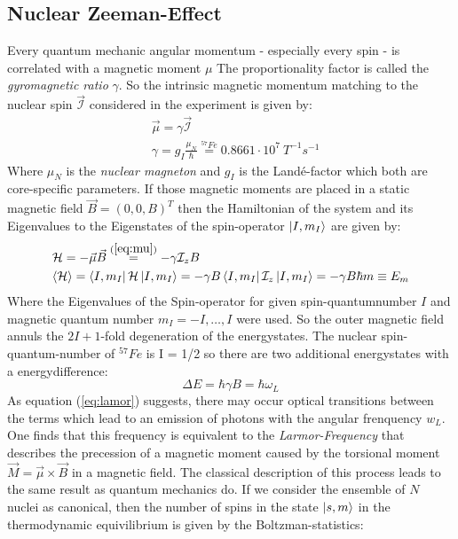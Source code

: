 	\subsection{Nuclear Zeeman-Effect}
		Every quantum mechanic angular momentum - especially every spin - is correlated with a magnetic moment $\mu$ The proportionality factor is called the \textit{gyromagnetic ratio} $\gamma$. So the intrinsic magnetic momentum matching to the nuclear spin $\vec{\mathcal{I}}$ considered in the experiment is given by:
			\begin{align}
				&\vec{\mu} = \gamma \vec{\mathcal{I}} \label{eq:mu}\\
				&\gamma  = g_I \frac{\mu_N}{\hbar} \overset{^{57}Fe}{=} 0.8661\cdot 10^{7}\ \unit{T^{-1}s^{-1}} \label{eq:gamma}
			\end{align}
		Where $\mu_N$ is the \textit{nuclear magneton} and $g_I$ is the Land\'{e}-factor which both are core-specific pa\-ra\-me\-ters. If those magnetic moments are placed in a static magnetic field $\vec{B} = (0,0,B)^T$ then the Hamiltonian of the system and its Eigenvalues to the Eigenstates of the spin-operator $\ket{I,m_I}$ are given by:
			\begin{align}
				&\mathcal{H} = - \vec{\mu} \vec{B} \overset{(\ref{eq:mu})}{=} - \gamma \mathcal{I}_zB \\
				&\langle\mathcal{H}\rangle = \bra{I,m_I}\mathcal{H}\ket{I,m_I} = -\gamma B \bra{I,m_I}\mathcal{I}_z\ket{I,m_I} = -\gamma B \hbar m \equiv E_m
			\end{align}
		Where the Eigenvalues of the Spin-operator for given spin-quantumnumber $I$ and magnetic quantum number $m_I = -I,\dots,I$ were used. So the outer magnetic field annuls the $2I+1$-fold degeneration of the energystates. The nuclear spin-quantum-number of $^{57}Fe$ is I = 1/2 so there are two additional energystates with a energydifference:
			\begin{equation}
				\Delta E = \hbar \gamma B = \hbar \omega_L \label{eq:lamor}
			\end{equation}
		As equation (\ref{eq:lamor}) suggests, there may occur optical transitions between the terms which lead to an emission of photons with the angular frenquency $w_L$. One finds that this frequency is equivalent to the \textit{Larmor-Frequency} that describes the precession of a magnetic moment caused by the torsional moment $\vec{M}=\vec{\mu}\times\vec{B}$ in a magnetic field. The classical description of this process leads to the same result as quantum mechanics do. If we consider the ensemble of $N$ nuclei as canonical, then the number of spins in the state $\ket{s,m}$ in the thermodynamic equivilibrium is given by the Boltzman-statistics:
